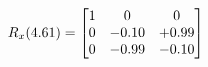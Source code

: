 \documentclass[preview]{standalone}
\begin{document}
\begin{align*}
\special{dvisvgm:raw <g id='unique000'>}R_{x}(4.61) = \begin{bmatrix}1 & 0 & 0 \\0 & -0.10 & +0.99 \\0 & -0.99 & -0.10\end{bmatrix}\special{dvisvgm:raw </g>}
\end{align*}
\end{document}
